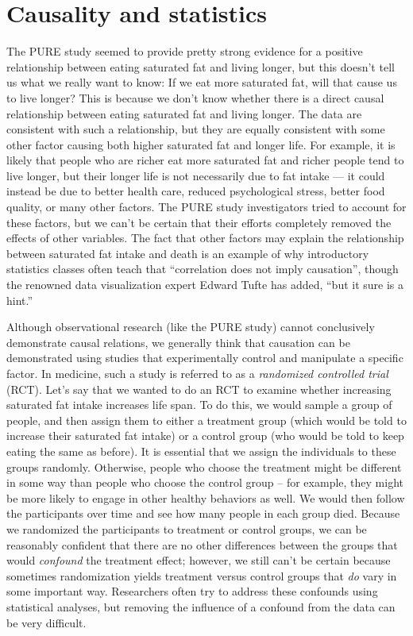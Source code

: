 \documentclass[12pt,]{book}
\theoremstyle{definition}
\theoremstyle{definition}
\theoremstyle{definition}
\theoremstyle{remark}
\begin{document}
\hypertarget{causality-and-statistics}{%
\section{Causality and statistics}\label{causality-and-statistics}}

The PURE study seemed to provide pretty strong evidence for a positive relationship between eating saturated fat and living longer, but this doesn't tell us what we really want to know: If we eat more saturated fat, will that cause us to live longer? This is because we don't know whether there is a direct causal relationship between eating saturated fat and living longer. The data are consistent with such a relationship, but they are equally consistent with some other factor causing both higher saturated fat and longer life. For example, it is likely that people who are richer eat more saturated fat and richer people tend to live longer, but their longer life is not necessarily due to fat intake --- it could instead be due to better health care, reduced psychological stress, better food quality, or many other factors. The PURE study investigators tried to account for these factors, but we can't be certain that their efforts completely removed the effects of other variables. The fact that other factors may explain the relationship between saturated fat intake and death is an example of why introductory statistics classes often teach that ``correlation does not imply causation'', though the renowned data visualization expert Edward Tufte has added, ``but it sure is a hint.''

Although observational research (like the PURE study) cannot conclusively demonstrate causal relations, we generally think that causation can be demonstrated using studies that experimentally control and manipulate a specific factor. In medicine, such a study is referred to as a \emph{randomized controlled trial} (RCT). Let's say that we wanted to do an RCT to examine whether increasing saturated fat intake increases life span. To do this, we would sample a group of people, and then assign them to either a treatment group (which would be told to increase their saturated fat intake) or a control group (who would be told to keep eating the same as before). It is essential that we assign the individuals to these groups randomly. Otherwise, people who choose the treatment might be different in some way than people who choose the control group -- for example, they might be more likely to engage in other healthy behaviors as well. We would then follow the participants over time and see how many people in each group died. Because we randomized the participants to treatment or control groups, we can be reasonably confident that there are no other differences between the groups that would \emph{confound} the treatment effect; however, we still can't be certain because sometimes randomization yields treatment versus control groups that \emph{do} vary in some important way. Researchers often try to address these confounds using statistical analyses, but removing the influence of a confound from the data can be very difficult.
\end{document}
